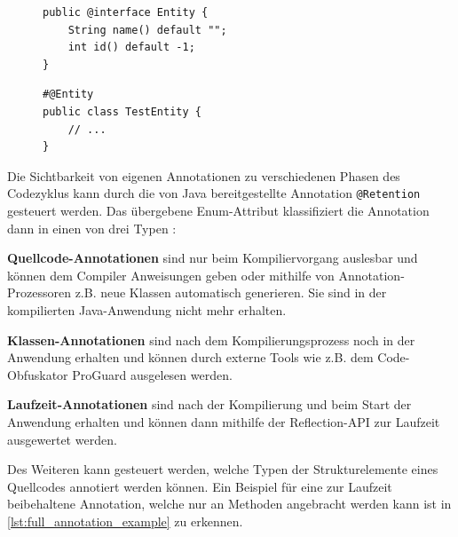 \begin{description}
	\begin{figure}[H]
		\noindent
		\begin{adjustbox}{minipage=[t]{.45\linewidth},gstore totalheight=\heightone,margin=\fboxsep+\fboxrule}
			\begin{lstlisting}[caption=Deklaration -- Marker Annotation., captionpos=b, label=lst:decl_marker]
public @interface Entity {
	String name() default "";
	int id() default -1;
}
			\end{lstlisting}
		\end{adjustbox}\hfill
		\begin{adjustbox}{minipage=[t][\heightone]{0.5\linewidth}}
			\begin{lstlisting}[caption=Anwendung -- Marker Annotation, captionpos=b, label=lst:appl_marker]
#@Entity
public class TestEntity {
	// ...
}
			\end{lstlisting}
		\end{adjustbox}
	\end{figure}
\end{description}
\noindent Die Sichtbarkeit von eigenen Annotationen zu verschiedenen Phasen des Codezyklus kann durch die von Java bereitgestellte Annotation \texttt{@Retention} gesteuert werden. Das übergebene Enum-Attribut klassifiziert die Annotation dann in einen von drei Typen \cite{Rocha2011}:
\begin{description}
	\item \textbf{Quellcode-Annotationen} sind nur beim Kompiliervorgang auslesbar und können dem Compiler Anweisungen geben oder mithilfe von Annotation-Prozessoren z.B. neue Klassen automatisch generieren. Sie sind in der kompilierten Java-Anwendung nicht mehr erhalten.
	\item \textbf{Klassen-Annotationen} sind nach dem Kompilierungsprozess noch in der Anwendung erhalten und können durch externe Tools wie z.B. dem Code-Obfuskator ProGuard ausgelesen werden.
	\item \textbf{Laufzeit-Annotationen} sind nach der Kompilierung und beim Start der Anwendung erhalten und können dann mithilfe der Reflection-API zur Laufzeit ausgewertet werden.
\end{description}
\noindent Des Weiteren kann gesteuert werden, welche Typen der Strukturelemente eines Quellcodes annotiert werden können. Ein Beispiel für eine zur Laufzeit beibehaltene Annotation, welche nur an Methoden angebracht werden kann ist in \autoref{lst:full_annotation_example} zu erkennen.
